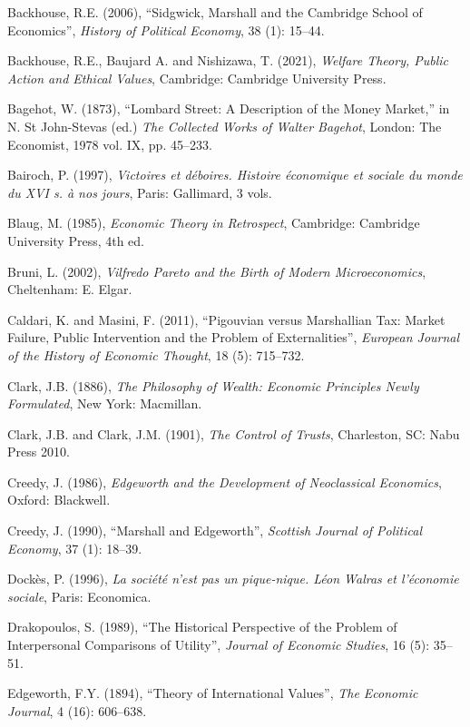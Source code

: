 \documentclass[12pt]{article}
\begin{document}
\begin{description}
    \item Backhouse, R.E. (2006), “Sidgwick, Marshall and the Cambridge School of Economics”, \textit{History of Political Economy}, 38 (1): 15–44.
    \item Backhouse, R.E., Baujard A. and Nishizawa, T. (2021), \textit{Welfare Theory, Public Action and Ethical Values}, Cambridge: Cambridge University Press.
    \item Bagehot, W. (1873), “Lombard Street: A Description of the Money Market,” in N. St John-Stevas (ed.) \textit{The Collected Works of Walter Bagehot}, London: The Economist, 1978 vol. IX, pp. 45–233.
    \item Bairoch, P. (1997), \textit{Victoires et déboires. Histoire économique et sociale du monde du XVI s. à nos jours}, Paris: Gallimard, 3 vols.
    \item Blaug, M. (1985), \textit{Economic Theory in Retrospect}, Cambridge: Cambridge University Press, 4th ed.
    \item Bruni, L. (2002), \textit{Vilfredo Pareto and the Birth of Modern Microeconomics}, Cheltenham: E. Elgar.
    \item Caldari, K. and Masini, F. (2011), “Pigouvian versus Marshallian Tax: Market Failure, Public Intervention and the Problem of Externalities”, \textit{European Journal of the History of Economic Thought}, 18 (5): 715–732.
    \item Clark, J.B. (1886), \textit{The Philosophy of Wealth: Economic Principles Newly Formulated}, New York: Macmillan.
    \item Clark, J.B. and Clark, J.M. (1901), \textit{The Control of Trusts}, Charleston, SC: Nabu Press 2010.
    \item Creedy, J. (1986), \textit{Edgeworth and the Development of Neoclassical Economics}, Oxford: Blackwell.
    \item Creedy, J. (1990), “Marshall and Edgeworth”, \textit{Scottish Journal of Political Economy}, 37 (1): 18–39.
    \item Dockès, P. (1996), \textit{La société n’est pas un pique-nique. Léon Walras et l’économie sociale}, Paris: Economica.
    \item Drakopoulos, S. (1989), “The Historical Perspective of the Problem of Interpersonal Comparisons of Utility”, \textit{Journal of Economic Studies}, 16 (5): 35–51.
    \item Edgeworth, F.Y. (1894), “Theory of International Values”, \textit{The Economic Journal}, 4 (16): 606–638.

\end{description}
\end{document}
